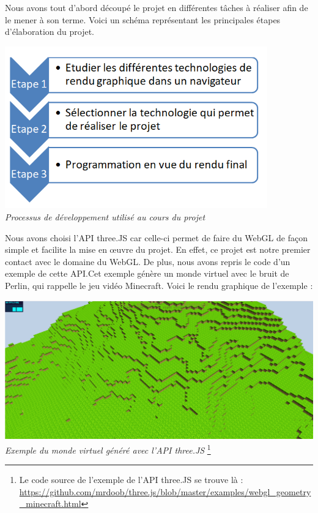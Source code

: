 ﻿Nous avons tout d'abord découpé le projet en différentes tâches à réaliser afin de le mener à son terme. Voici un schéma représentant les principales étapes d'élaboration du projet.

\begin{center}
	\includegraphics[height=7cm]{images/Processus_DEV.png}\\
	\textit{Processus de développement utilisé au cours du projet}\\
\end{center}

\newpage
Nous avons choisi l'API three.JS car celle-ci permet de faire du WebGL de façon simple et facilite la mise en œuvre du projet. En effet, ce projet est notre premier contact avec le domaine du WebGL. De plus, nous avons repris le code d'un exemple de cette API.Cet exemple génère un monde virtuel avec le bruit de Perlin, qui rappelle le jeu vidéo Minecraft. Voici le rendu graphique de l'exemple :

\begin{center}
	\includegraphics[height=6cm]{images/threeJS_minecraft.png}\\
	\textit{Exemple du monde virtuel généré avec l'API three.JS}
	\footnote{Le code source de l'exemple de l'API three.JS se trouve là : \url{https://github.com/mrdoob/three.js/blob/master/examples/webgl_geometry_minecraft.html}}
\end{center}

